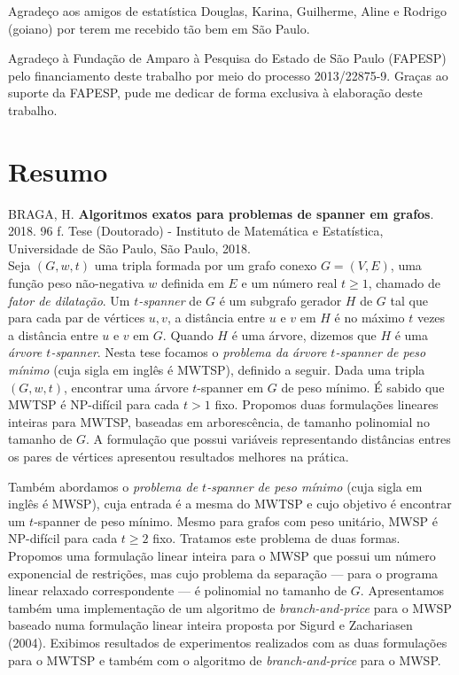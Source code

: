 \documentclass[12pt,twoside,a4paper]{book}
\newcommand{\titulo}{Algoritmos exatos para problemas de spanner em grafos}
\begin{document}
Agradeço aos amigos de estatística Douglas,
Karina, Guilherme, Aline e Rodrigo (goiano) por terem me recebido tão bem em
São Paulo.

Agradeço à Fundação de Amparo à Pesquisa do Estado de São Paulo (FAPESP)
pelo financiamento deste trabalho por meio do processo 2013/22875-9. Graças
ao suporte da \mbox{FAPESP}, pude me dedicar de forma exclusiva
à elaboração deste trabalho.

\chapter*{Resumo}

\noindent BRAGA, H. \textbf{\titulo}. 
2018. 96 f.
Tese (Doutorado) - Instituto de Matemática e Estatística,
Universidade de São Paulo, São Paulo, 2018.
\\

Seja $(G,w,t)$ uma tripla formada por um grafo conexo $G = (V,E)$, uma
função peso não-negativa $w$ definida em $E$ e um número real $t \ge 1$,
chamado de \emph{fator de dilatação}.  Um \emph{$t$-spanner} de $G$ é um
subgrafo gerador $H$ de $G$ tal que para cada par de vértices $u,v$, a
distância entre $u$ e $v$ em $H$ é no máximo $t$ vezes a distância
entre $u$ e $v$ em $G$.  Quando $H$ é uma árvore, dizemos que $H$ é
uma \emph{árvore $t$-spanner}.  Nesta tese focamos o \emph{problema da
  árvore $t$-spanner de peso mínimo} (cuja sigla em inglês é MWTSP),
definido a seguir. Dada uma tripla $(G,w,t)$, encontrar uma árvore
$t$-spanner em $G$ de peso mínimo. É sabido que MWTSP é NP-difícil
para cada $t > 1$ fixo. Propomos duas formulações lineares inteiras
para MWTSP, baseadas em arborescência, de tamanho polinomial no tamanho de $G$.  A
formulação que possui variáveis representando distâncias entres os
pares de vértices apresentou resultados melhores na prática.

Também abordamos o \emph{problema de $t$-spanner de peso mínimo} (cuja
sigla em inglês é MWSP), cuja entrada é a mesma do MWTSP e cujo
objetivo é encontrar um $t$-spanner de peso mínimo. Mesmo para grafos
com peso unitário, MWSP é NP-difícil para cada $t \ge 2$ fixo.
Tratamos este problema de duas formas. Propomos uma formulação linear
inteira para o MWSP que possui um número exponencial de restrições, mas
cujo problema da separação --- para o programa linear relaxado
correspondente --- é polinomial no tamanho de $G$. Apresentamos também uma implementação
de um algoritmo de \emph{branch-and-price} para o MWSP baseado numa
formulação linear inteira proposta por Sigurd e Zachariasen (2004).
Exibimos resultados de experimentos realizados com
as duas formulações para o MWTSP e também com o algoritmo de
\emph{branch-and-price} para o MWSP.
\\
\end{document}
